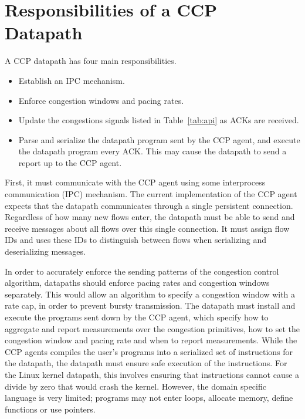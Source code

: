 \section{Responsibilities of a CCP Datapath}
\label{sec:impl:datapath_responsibilites}
A CCP datapath has four main responsibilities.
  \begin{itemize}
    \item Establish an IPC mechanism.
    \item Enforce congestion windows and pacing rates.
    \item Update the congestions signals listed in Table~\ref{tab:api} as ACKs are received.
	\item Parse and serialize the datapath program sent by the CCP agent, and execute the datapath program every ACK. This may cause the datapath to send a report up to the CCP agent.
  \end{itemize}
First, it must communicate with the CCP agent using some interprocess communication (IPC) mechanism.
The current implementation of the CCP agent expects that the datapath communicates through a single persistent connection.
Regardless of how many new flows enter, the datapath must be able to send and receive messages about all flows over this single connection.
It must assign flow IDs and uses these IDs to distinguish between flows when serializing and deserializing messages.\par

In order to accurately enforce the sending patterns of the congestion control algorithm, datapaths should enforce pacing rates and congestion windows separately. This would allow an algorithm to specify a congestion window with a rate cap, in order to prevent bursty transmission.
The datapath must install and execute the programs sent down by the CCP agent, which specify how to aggregate and report measurements over the congestion primitives, how to set the congestion window and pacing rate and when to report measurements.
While the CCP agents compiles the user's programs into a serialized set of instructions for the datapath, the datapath must ensure safe execution of the instructions.
For the Linux kernel datapath, this involves ensuring that instructions cannot cause a divide by zero that would crash the kernel.
However, the domain specific language is very limited; programs may not enter loops, allocate memory, define functions or use pointers.

